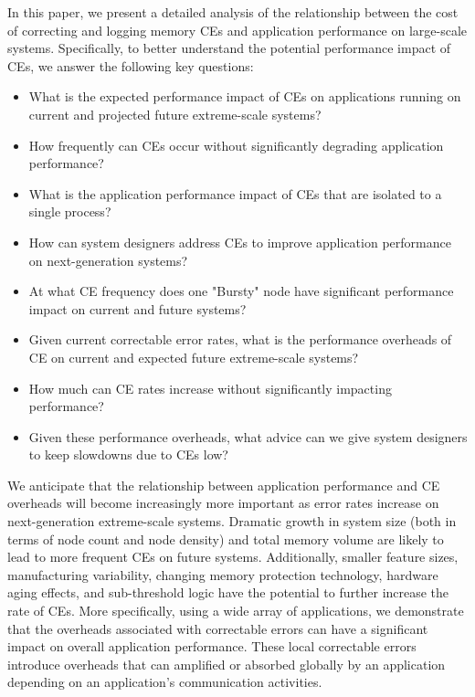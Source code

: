

In this paper, we present a detailed analysis of the relationship between the cost of
correcting and logging memory CEs and application performance on large-scale systems.
Specifically, to better understand the potential performance impact of CEs, we answer the 
following key questions:

\begin{itemize}
  \item What is the expected performance impact of CEs on applications running on current and 
        projected future extreme-scale systems?
  \item How frequently can CEs occur without significantly degrading application performance?
  \item What is the application performance impact of CEs that are isolated to a single process?
  \item How can system designers address CEs to improve application performance on next-generation systems?
\end{itemize}
\begin{itemize}
        \item At what CE frequency does one "Bursty" node have significant
              performance impact on current and future systems?
        \item Given current correctable error rates, what is the performance
              overheads of CE on current and expected future extreme-scale systems?
        \item How much can CE rates increase without significantly impacting
              performance?
        \item Given these performance overheads, what advice can we give system
              designers to keep slowdowns due to CEs low?
\end{itemize}

We anticipate that the relationship between application performance and CE 
overheads will become increasingly more important as error rates increase on
next-generation extreme-scale systems.  Dramatic growth in system size (both
in terms of node count and node density) and total memory volume are likely
to lead to more frequent CEs on future systems. 
Additionally, smaller feature sizes, manufacturing variability, changing memory
protection technology, hardware aging effects, and sub-threshold logic have the
potential to further increase the rate of CEs.  
More specifically, using a wide array of
applications, we demonstrate that the overheads associated with  correctable
errors can have a significant impact on overall application performance.  These
local correctable errors introduce overheads that can amplified or absorbed
globally by an application depending on an application's communication
activities. 

